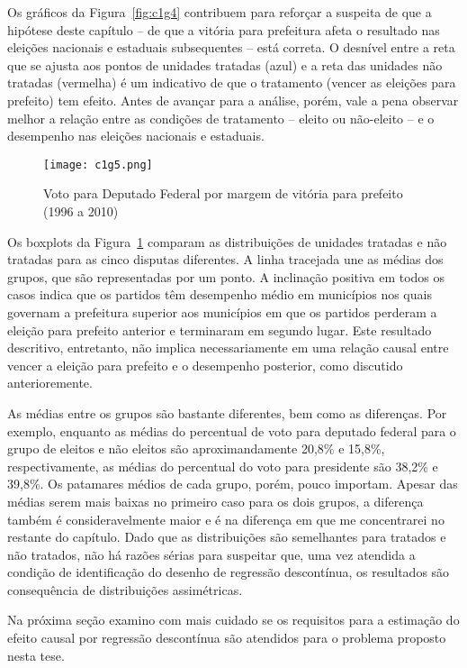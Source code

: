 Os gráficos da Figura~\ref{fig:c1g4} contribuem para reforçar a suspeita de que a hipótese deste capítulo -- de que a vitória para prefeitura afeta o resultado nas eleições nacionais e estaduais subsequentes -- está correta. O desnível entre a reta que se ajusta aos pontos de unidades tratadas (azul) e a reta das unidades não tratadas (vermelha) é um indicativo de que o tratamento (vencer as eleições para prefeito) tem efeito. Antes de avançar para a análise, porém, vale a pena observar melhor a relação entre as condições de tratamento -- eleito ou não-eleito -- e o desempenho nas eleições nacionais e estaduais.

\begin{figure}[htp]
	\centering
	\texttt{[image: c1g5.png]}
	\caption{Voto para Deputado Federal por margem de vitória para prefeito (1996 a 2010)}
	\label{fig:c1g5} 
\end{figure}

Os boxplots da Figura~\ref{fig:c1g5} comparam as distribuições de unidades tratadas e não tratadas para as cinco disputas diferentes. A linha tracejada une as médias dos grupos, que são representadas por um ponto. A inclinação positiva em todos os casos indica que os partidos têm desempenho médio em municípios nos quais governam a prefeitura superior aos municípios em que os partidos perderam a eleição para prefeito anterior e terminaram em segundo lugar. Este resultado descritivo, entretanto, não implica necessariamente em uma relação causal entre vencer a eleição para prefeito e o desempenho posterior, como discutido anterioremente.

As médias entre os grupos são bastante diferentes, bem como as diferenças. Por exemplo, enquanto as médias do percentual de voto para deputado federal para o grupo de eleitos e não eleitos são aproximandamente 20,8\% e 15,8\%, respectivamente, as médias do percentual do voto para presidente são 38,2\% e 39,8\%. Os patamares médios de cada grupo, porém, pouco importam. Apesar das médias serem mais baixas no primeiro caso para os dois grupos, a diferença também é consideravelmente maior e é na diferença em que me concentrarei no restante do capítulo. Dado que as distribuições são semelhantes para tratados e não tratados, não há razões sérias para suspeitar que, uma vez atendida a condição de identificação do desenho de regressão descontínua, os resultados são consequência de distribuições assimétricas. 

Na próxima seção examino com mais cuidado se os requisitos para a estimação do efeito causal por regressão descontínua são atendidos para o problema proposto nesta tese. 

